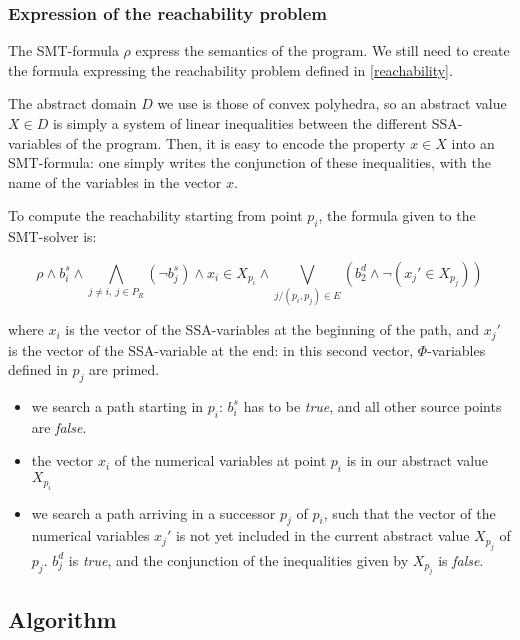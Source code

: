 \documentclass[a4paper,english,titlepage,11pt]{report}
\begin{document}
	\subsubsection{Expression of the reachability problem}
	\label{smtformula}
	The SMT-formula $\rho$ express the semantics of the program. We still need
	to create the
	formula expressing the reachability problem defined in \ref{reachability}.

	The abstract domain $D$ we use is those of convex polyhedra, so an abstract
	value $X \in D$ is simply a system of linear inequalities between the
	different SSA-variables of the program. Then, it is easy to encode the
	property $x \in X$ into an SMT-formula: one simply writes the conjunction of
	these inequalities, with the name of the variables in the vector $x$.

	To compute the reachability starting from point $p_i$, the formula given to
	the SMT-solver is:

	$$\rho \wedge b_i^s \wedge \bigwedge_{j\neq i,\ j\in P_R} (\neg b_j^s)
	\wedge x_i \in X_{p_i} \wedge \bigvee_{j/(p_i,p_j)\in E} (b_2^d \wedge \neg
	(x_j' \in X_{p_j}))$$

	where $x_i$ is the vector of the SSA-variables at the beginning of the path,
	and $x_j'$ is the vector of the SSA-variable at the end: in this second
	vector, $\Phi$-variables defined in $p_j$ are primed.

	\begin{itemize}
	\item we search a path starting in $p_i$: $b_i^s$ has to be \emph{true}, and
	all other source points are \emph{false}.
	\item the vector $x_i$ of the numerical variables at point $p_i$ is in our
	abstract value $X_{p_i}$
	\item we search a path arriving in a successor $p_j$ of $p_i$, such that the
	vector of the numerical variables $x_j'$ is not yet included in the current
	abstract value $X_{p_j}$ of $p_j$. $b_j^d$ is \emph{true}, and the
	conjunction of the inequalities given by $X_{p_j}$ is \emph{false}.
	\end{itemize}

	\subsection{Algorithm}
	
\end{document}
